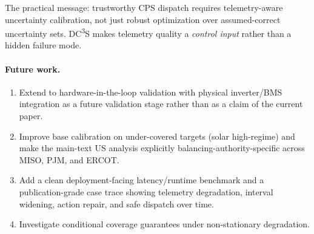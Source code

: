 \documentclass[11pt,a4paper,twocolumn]{article}
\begin{document}
The practical message: trustworthy CPS dispatch requires telemetry-aware uncertainty calibration, not just robust optimization over assumed-correct uncertainty sets.  DC\textsuperscript{3}S makes telemetry quality a \emph{control input} rather than a hidden failure mode.

\paragraph{Future work.}
\begin{enumerate}[leftmargin=*,topsep=2pt,itemsep=1pt]
  \item Extend to hardware-in-the-loop validation with physical inverter/BMS integration as a future validation stage rather than as a claim of the current paper.
  \item Improve base calibration on under-covered targets (solar high-regime) and make the main-text US analysis explicitly balancing-authority-specific across MISO, PJM, and ERCOT.
  \item Add a clean deployment-facing latency/runtime benchmark and a publication-grade case trace showing telemetry degradation, interval widening, action repair, and safe dispatch over time.
  \item Investigate conditional coverage guarantees under non-stationary degradation.
\end{enumerate}


\end{document}
